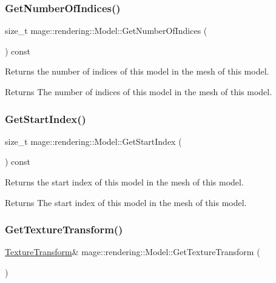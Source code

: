 \subsubsection{\texorpdfstring{Get\+Number\+Of\+Indices()}{GetNumberOfIndices()}}
{\footnotesize\ttfamily size\+\_\+t mage\+::rendering\+::\+Model\+::\+Get\+Number\+Of\+Indices (\begin{DoxyParamCaption}{ }\end{DoxyParamCaption}) const\hspace{0.3cm}{\ttfamily [noexcept]}}

Returns the number of indices of this model in the mesh of this model.

\begin{DoxyReturn}{Returns}
The number of indices of this model in the mesh of this model. 
\end{DoxyReturn}
\mbox{\label{classmage_1_1rendering_1_1_model_a2944b26434496b580bbbebbccd592ee3}} 
\subsubsection{\texorpdfstring{Get\+Start\+Index()}{GetStartIndex()}}
{\footnotesize\ttfamily size\+\_\+t mage\+::rendering\+::\+Model\+::\+Get\+Start\+Index (\begin{DoxyParamCaption}{ }\end{DoxyParamCaption}) const\hspace{0.3cm}{\ttfamily [noexcept]}}

Returns the start index of this model in the mesh of this model.

\begin{DoxyReturn}{Returns}
The start index of this model in the mesh of this model. 
\end{DoxyReturn}
\mbox{\label{classmage_1_1rendering_1_1_model_a57e4069226ce9bade50bc17503378f08}} 
\subsubsection{\texorpdfstring{Get\+Texture\+Transform()}{GetTextureTransform()}\hspace{0.1cm}{\footnotesize\ttfamily [1/2]}}
{\footnotesize\ttfamily \mbox{\hyperlink{classmage_1_1_texture_transform}{Texture\+Transform}}\& mage\+::rendering\+::\+Model\+::\+Get\+Texture\+Transform (\begin{DoxyParamCaption}{ }\end{DoxyParamCaption})\hspace{0.3cm}{\ttfamily [noexcept]}}

